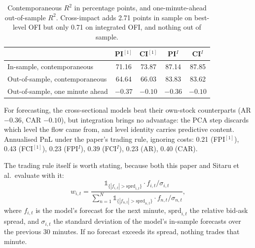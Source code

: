 \documentclass[11pt]{article}
\newcommand{\ind}[1]{\mathbb{1}_{\{#1\}}}
\begin{document}
\begin{table}[h]
\centering
\captionsetup{font=small}
\caption{Contemporaneous $R^2$ in percentage points, and one-minute-ahead
out-of-sample $R^2$. Cross-impact adds 2.71 points in sample on best-level OFI
but only 0.71 on integrated OFI, and nothing out of sample.}
\small
\begin{tabular}{lcccc}
\toprule
& PI$^{[1]}$ & CI$^{[1]}$ & PI$^{I}$ & CI$^{I}$ \\
\midrule
In-sample, contemporaneous & 71.16 & 73.87 & 87.14 & 87.85 \\
Out-of-sample, contemporaneous & 64.64 & 66.03 & 83.83 & 83.62 \\
Out-of-sample, one minute ahead & $-0.37$ & $-0.10$ & $-0.36$ & $-0.10$ \\
\bottomrule
\end{tabular}
\end{table}

For forecasting, the cross-sectional models beat their own-stock counterparts
(AR $-0.36$, CAR $-0.10$), but integration brings no advantage: the PCA step
discards which level the flow came from, and level identity carries predictive
content. Annualised PnL under the paper's trading rule, ignoring costs: 0.21
(FPI$^{[1]}$), 0.43 (FCI$^{[1]}$), 0.23 (FPI$^{I}$), 0.39 (FCI$^{I}$), 0.23
(AR), 0.40 (CAR).

The trading rule itself is worth stating, because both this paper and Sitaru et
al.\ evaluate with it:
\begin{equation}
w_{i,t}=\frac{\ind{|f_{i,t}|>\mathrm{sprd}_{i,t}}\cdot f_{i,t}/\sigma_{i,t}}
{\sum_{n=1}^{N}\ind{|f_{n,t}|>\mathrm{sprd}_{n,t}}\cdot f_{n,t}/\sigma_{n,t}},
\end{equation}
where $f_{i,t}$ is the model's forecast for the next minute,
$\mathrm{sprd}_{i,t}$ the relative bid-ask spread, and $\sigma_{i,t}$ the
standard deviation of the model's in-sample forecasts over the previous 30
minutes. If no forecast exceeds its spread, nothing trades that minute.
\end{document}
